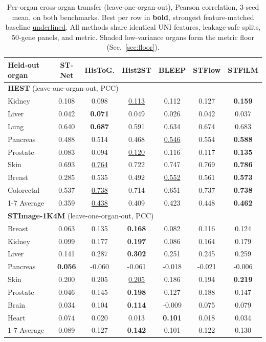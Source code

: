 \begin{table}[t]
\centering
\small
\setlength{\tabcolsep}{6pt}
\begin{tabular}{lcccccc}
\toprule
Held-out organ & ST-Net & HisToG. & Hist2ST & BLEEP & STFlow & STFiLM \\
\midrule
\multicolumn{7}{l}{\textbf{HEST} (leave-one-organ-out, PCC)} \\
\midrule
Kidney & 0.108 & 0.098 & \underline{0.113} & 0.112 & 0.127 & \textbf{0.159} \\
Liver & 0.042 & \textbf{0.071} & 0.049 & 0.026 & 0.042 & 0.037 \\
Lung & 0.640 & \textbf{0.687} & 0.591 & 0.634 & 0.674 & 0.683 \\
Pancreas & 0.488 & 0.514 & 0.468 & \underline{0.546} & 0.554 & \textbf{0.588} \\
Prostate & 0.083 & 0.094 & \underline{0.120} & 0.116 & 0.117 & \textbf{0.135} \\
Skin & 0.693 & \underline{0.764} & 0.722 & 0.747 & 0.769 & \textbf{0.786} \\
Breast & 0.285 & 0.535 & 0.492 & \underline{0.552} & 0.561 & \textbf{0.573} \\
Colorectal & 0.537 & \underline{0.738} & 0.714 & 0.651 & 0.737 & \textbf{0.738} \\
\cmidrule(lr){1-7}
Average & 0.359 & \underline{0.438} & 0.409 & 0.423 & 0.448 & \textbf{0.462} \\
\midrule
\multicolumn{7}{l}{\textbf{STImage-1K4M} (leave-one-organ-out, PCC)} \\
\midrule
Breast & 0.063 & 0.135 & \textbf{0.168} & 0.082 & 0.116 & 0.124 \\
Kidney & 0.099 & 0.177 & \textbf{0.197} & 0.086 & 0.164 & 0.179 \\
Liver & 0.141 & 0.287 & \textbf{0.302} & 0.251 & 0.245 & 0.259 \\
Pancreas & \textbf{0.056} & -0.060 & -0.061 & -0.018 & -0.021 & -0.006 \\
Skin & 0.200 & 0.205 & \underline{0.205} & 0.186 & 0.194 & \textbf{0.219} \\
Prostate & 0.046 & 0.145 & \textbf{0.198} & 0.127 & 0.188 & 0.147 \\
Brain & 0.034 & 0.104 & \textbf{0.114} & -0.009 & 0.075 & 0.079 \\
Heart & 0.074 & 0.020 & 0.013 & \textbf{0.101} & 0.018 & 0.034 \\
\cmidrule(lr){1-7}
Average & 0.089 & 0.127 & \textbf{0.142} & 0.101 & 0.122 & 0.130 \\
\bottomrule
\end{tabular}
\caption{Per-organ cross-organ transfer (leave-one-organ-out), Pearson correlation, 3-seed mean, on both benchmarks. Best per row in \textbf{bold}, strongest feature-matched baseline \underline{underlined}. All methods share identical UNI features, leakage-safe splits, 50-gene panels, and metric. Shaded low-variance organs form the metric floor (Sec.~\ref{sec:floor}).}
\label{tab:perorgan}
\end{table}
